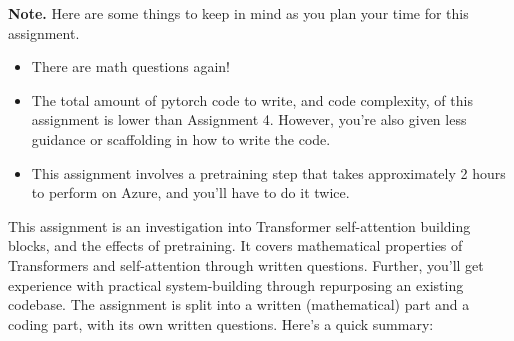 \begin{framed}
\noindent
 \textbf{Note.} Here are some things to keep in mind as you plan your time for this assignment.
\begin{itemize}
   \item There are math questions again!
   \item The total amount of pytorch code to write, and code complexity, of this assignment is lower than Assignment 4. 
         However, you're also given less guidance or scaffolding in how to write the code.
         \item  This assignment involves a pretraining step that takes approximately 2 hours to perform on Azure, and you'll have to do it twice.
\end{itemize}
\end{framed}
This assignment is an investigation into Transformer self-attention building blocks, and the effects of pretraining.
It covers mathematical properties of Transformers and self-attention through written questions.
Further, you'll get experience with practical system-building through repurposing an existing codebase.
The assignment is split into a written (mathematical) part and a coding part, with its own written questions.
Here's a quick summary:

